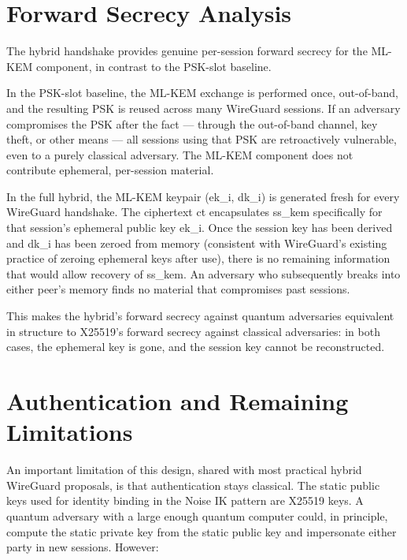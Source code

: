 \section{Forward Secrecy Analysis}

The hybrid handshake provides genuine per-session forward secrecy for the ML-KEM component, in contrast to the PSK-slot baseline.

In the PSK-slot baseline, the ML-KEM exchange is performed once, out-of-band, and the resulting PSK is reused across many WireGuard sessions. If an adversary compromises the PSK after the fact — through the out-of-band channel, key theft, or other means — all sessions using that PSK are retroactively vulnerable, even to a purely classical adversary. The ML-KEM component does not contribute ephemeral, per-session material.

In the full hybrid, the ML-KEM keypair (ek\_i, dk\_i) is generated fresh for every WireGuard handshake. The ciphertext ct encapsulates ss\_kem specifically for that session's ephemeral public key ek\_i. Once the session key has been derived and dk\_i has been zeroed from memory (consistent with WireGuard's existing practice of zeroing ephemeral keys after use), there is no remaining information that would allow recovery of ss\_kem. An adversary who subsequently breaks into either peer's memory finds no material that compromises past sessions.

This makes the hybrid's forward secrecy against quantum adversaries equivalent in structure to X25519's forward secrecy against classical adversaries: in both cases, the ephemeral key is gone, and the session key cannot be reconstructed.

\section{Authentication and Remaining Limitations}

An important limitation of this design, shared with most practical hybrid WireGuard proposals, is that authentication stays classical. The static public keys used for identity binding in the Noise IK pattern are X25519 keys. A quantum adversary with a large enough quantum computer could, in principle, compute the static private key from the static public key and impersonate either party in new sessions. However:

